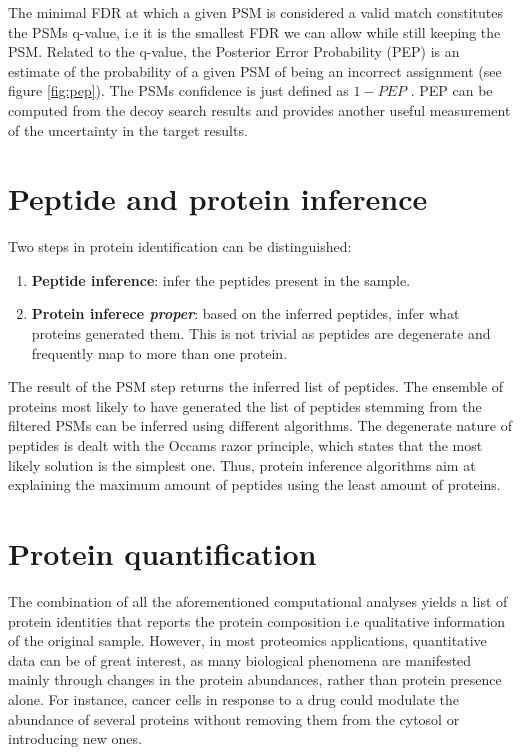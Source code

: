 The minimal FDR at which a given PSM is considered a valid match constitutes the PSM\textquotesingle s q-value, i.e it is the smallest FDR we can allow while still keeping the PSM. Related to the q-value, the Posterior Error Probability (PEP) is an estimate of the probability of a given PSM of being an incorrect assignment (see figure \ref{fig:pep}). The PSM\textquotesingle s confidence is just defined as $1-PEP$ \cite{Nesvizhskii2010}. PEP can be computed from the decoy search results and provides another useful measurement of the uncertainty in the target results.




\section{Peptide and protein inference}
\label{sec:inference}

Two steps in protein identification can be distinguished:

\begin{enumerate}

\item \textbf{Peptide inference}: infer the peptides present in the sample.
\item \textbf{Protein inferece \textit{proper}}: based on the inferred peptides, infer what proteins generated them. This is not trivial as peptides are degenerate and frequently map to more than one protein.
\end{enumerate}

The result of the PSM step returns the inferred list of peptides. The ensemble of proteins most likely to have generated the list of peptides stemming from the filtered PSMs can be inferred using different algorithms. The degenerate nature of peptides is dealt with the Occam\textquotesingle s razor principle, which states that the most likely solution is the simplest one. Thus, protein inference algorithms aim at explaining the maximum amount of peptides using the least amount of proteins.

\section{Protein quantification}
\label{sec:quantification}

The combination of all the aforementioned computational analyses yields a list of protein identities that reports the protein composition i.e qualitative information of the original sample. However, in most proteomics applications, quantitative data can be of great interest, as many biological phenomena are manifested mainly through changes in the protein abundances, rather than protein presence alone. For instance, cancer cells in response to a drug could modulate the abundance of several proteins without removing them from the cytosol or introducing new ones.

